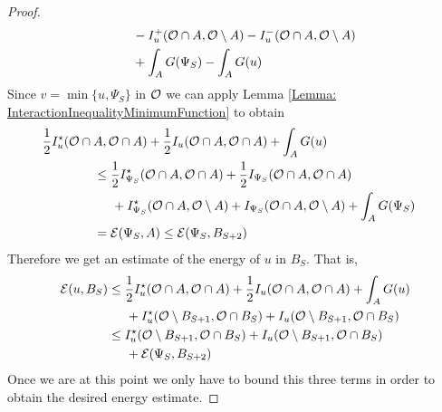 \begin{proof}
\begin{align*}
& \hspace{5mm} - I_u^+(\mathcal{O} \cap A, \mathcal{O} \setminus A) - I_u^-(\mathcal{O} \cap A, \mathcal{O} \setminus A) \\
& \hspace{5mm} + \int_A G(\Psi_S) - \int_{A} G(u) 
\end{align*}
Since $v = \min\{u,\Psi_S\}$ in $\mathcal{O}$ we can apply Lemma \ref{Lemma: InteractionInequalityMinimumFunction} to obtain 
\begin{align*}
\frac{1}{2}I_u^\star(\ocal \cap A, \ocal \cap A) + \frac{1}{2}I_u(\ocal \cap A, \ocal \cap A) + \int_{A} G(u)\\ 
&\hspace{-65mm}\leq \frac{1}{2}I_{\Psi_S}^\star(\ocal \cap A, \ocal \cap A) + \frac{1}{2}I_{\Psi_S}(\ocal \cap A, \ocal \cap A)\\
&\hspace{-60mm} + I_{\Psi_S}^\star(\ocal \cap A, \ocal \setminus A) + I_{\Psi_S}(\ocal \cap A, \ocal \setminus A) + \int_A G(\Psi_S)  \\
&\hspace{-65mm} = \ecal(\Psi_S, A) \leq \ecal(\Psi_S,B_{S+2})
\end{align*}
Therefore we get an estimate of the energy of $u$ in $B_S$. That is,
\begin{align*}
\mathcal{E}(u,B_S) &\leq \frac{1}{2}I_u^\star(\mathcal{O} \cap A, \mathcal{O} \cap A) + \frac{1}{2}I_u(\mathcal{O} \cap A, \mathcal{O} \cap A) + \int_{A} G(u)\\
& \hspace{5mm} +I_u^\star(\mathcal{O} \setminus B_{S+1}, \mathcal{O} \cap B_S) + I_u(\mathcal{O} \setminus B_{S+1}, \mathcal{O} \cap B_S) \\
& \leq I_u^\star(\mathcal{O} \setminus B_{S+1}, \mathcal{O} \cap B_S) + I_u(\mathcal{O} \setminus B_{S+1}, \mathcal{O} \cap B_S) \\
& \hspace{5mm} + \mathcal{E}(\Psi_S,B_{S+2})
\end{align*}
Once we are at this point we only have to bound this three terms in order to obtain the desired energy estimate.


\end{proof}
